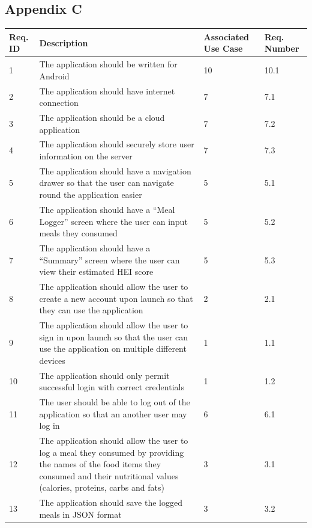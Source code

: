 \documentclass{article}
\begin{document}
\begin{appendicies}
\newpage
\section{Appendix C}
\begin{table}[!htbp]
\centering
\hspace*{-2cm}
\begin{tabular}{||m{1cm}|m{9cm}|m{2cm}|m{2cm}||}
    \hline
    Req. ID & Description & Associated Use Case & Req. Number\\
    \hline
    1 & The application should be written for Android  & 10 & 10.1\\
    \hline 
    2 & The application should have internet connection & 7 & 7.1\\
    \hline 
    3 & The application should be a cloud application & 7 & 7.2\\
    \hline 
    4 & The application should securely store user information on the server & 7 & 7.3\\
    \hline 
    5 & The application should have a navigation drawer so that the user can navigate round the application easier & 5 & 5.1\\
    \hline
    6 & The application should have a “Meal Logger” screen where the user can input meals they consumed & 5 & 5.2\\
    \hline
    7 & The application should have a “Summary” screen where the user can view their estimated HEI score & 5 & 5.3\\
    \hline
    8 & The application should allow the user to create a new account upon launch so that they can use the application & 2 & 2.1\\
    \hline 
    9 & The application should allow the user to sign in upon launch so that the user can use the application on multiple different devices & 1 & 1.1\\
    \hline
    10 & The application should only permit successful login with correct credentials & 1 & 1.2\\
    \hline
    11 & The user should be able to log out of the application so that an another user may log in & 6 & 6.1\\
    \hline
    12 & The application should allow the user to log a meal they consumed by providing the names of the food items they consumed and their nutritional values (calories, proteins, carbs and fats) & 3 & 3.1\\
    \hline
    13 & The application should save the logged meals in JSON format & 3 & 3.2\\

\end{tabular}
\end{table}
\end{appendicies}
\end{document}
